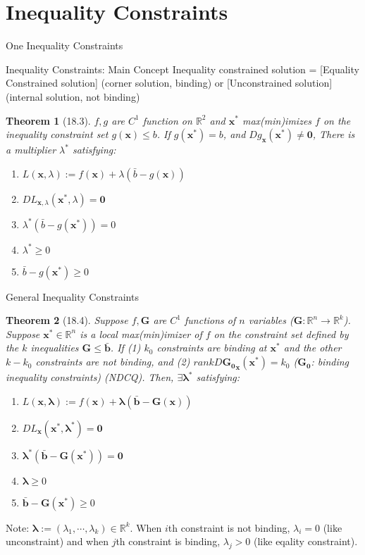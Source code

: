 \documentclass[a4paper,11pt]{article}
\newtheorem{thm}{Theorem}
\newcommand{\bb}{\mathbb}
\newcommand{\bd}{\mathbf}
\begin{document}
\section{Inequality Constraints} %
\label{sec:inequality_constraints}
\begin{frame}[t]{One Inequality Constraints}
	\begin{block}
		{Inequality Constraints: Main Concept}
		Inequality constrained solution = [Equality Constrained solution] (corner solution, binding) or [Unconstrained solution] (internal solution, not binding)
	\end{block}
	\begin{thm}
		[18.3] $f,g$ are $C^1$ function on $\bb{R}^2$ and $\bd{x^\ast}$ max(min)imizes $f$ on the inequality constraint set $g(\bd{x})\le b$. If $g(\bd{x^\ast})=b$, and $Dg_{\bd{x}}(\bd{x^\ast})\neq \bd{0}$, There is a multiplier $\lambda^\ast$ satisfying:
		\begin{enumerate}
			\item $L(\bd{x},\lambda):=f(\bd{x})+\lambda(\bar{b}-g(\bd{x}))$
			\item $DL_{\bd{x},\lambda}(\bd{x^\ast},\lambda)=\bd{0}$
			\item $\lambda^\ast(\bar{b}-g(\bd{x^\ast}))=0$
			\item $\lambda^\ast\ge 0$
			\item $\bar{b}-g(\bd{x^\ast})\ge 0$
		\end{enumerate}
	\end{thm}
\end{frame}

\begin{frame}[t]{General Inequality Constraints}
	\begin{thm}
		[18.4] Suppose $f,\bd{G}$ are $C^1$ functions of $n$ variables ($\bd{G}:\bb{R}^n\rightarrow\bb{R}^k$). Suppose $\bd{x^\ast}\in\bb{R}^n$ is a local max(min)imizer of $f$ on the constraint set defined by the $k$  inequalities $\bd{G}\le \bar{\bd{b}}$. If (1) $k_0$ constraints are binding at $\bd{x^\ast}$ and the other $k-k_0$ constraints are not binding, and (2) $rank D\bd{G_0}_{\bd{x}}(\bd{x^\ast})= k_0$ ($\bd{G_0}$: binding inequality constraints) (NDCQ). Then, $\exists\bd{\lambda^\ast}$ satisfying:
		\begin{enumerate}
			\item $L(\bd{x},\bd{\lambda}):=f(\bd{x})+\bd{\lambda}(\bar{\bd{b}}-\bd{G}(\bd{x}))$
			\item $DL_{\bd{x}}(\bd{x^\ast,\lambda^\ast})=\bd{0}$
			\item $\bd{\lambda^\ast}(\bar{\bd{b}}-\bd{G}(\bd{x^\ast}))=\bd{0}$
			\item $\bd{\lambda}\ge 0$
			\item $\bar{\bd{b}}-\bd{G}(\bd{x^\ast})\ge 0$
		\end{enumerate}
	\end{thm}
	Note: $\bd{\lambda}:=(\lambda_1,\cdots,\lambda_k)\in \bb{R}^k$. When $i$th constraint is not binding, $\lambda_i=0$ (like unconstraint) and when $j$th constraint is binding, $\lambda_j> 0$ (like eqality constraint). 
\end{frame}
\end{document}
